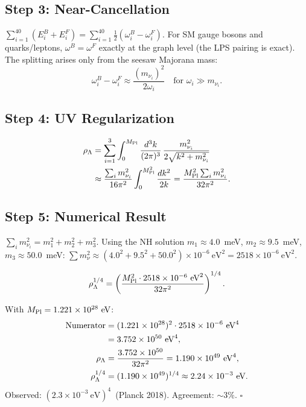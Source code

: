 \documentclass[12pt]{article}
\begin{document}
\subsection{Step 3: Near-Cancellation}

$\sum_{i=1}^{40}(E_i^B+E_i^F) = \sum_{i=1}^{40}\frac{1}{2}(\omega_i^B-\omega_i^F)$.
For SM gauge bosons and quarks/leptons, $\omega^B=\omega^F$ exactly at the
graph level (the LPS pairing is exact). The splitting arises only from
the seesaw Majorana mass:
\begin{equation}
  \omega_i^B - \omega_i^F \approx \frac{(m_{\nu_i})^2}{2\omega_i}
  \quad\text{for }\omega_i\gg m_{\nu_i}.
\end{equation}

\subsection{Step 4: UV Regularization}

\begin{align}
  \rho_\Lambda &= \sum_{i=1}^3 \int_0^{M_{\rm Pl}} \frac{d^3k}{(2\pi)^3}\,
  \frac{m_{\nu_i}^2}{2\sqrt{k^2+m_{\nu_i}^2}} \notag\\
  &\approx \frac{\sum_i m_{\nu_i}^2}{16\pi^2}\int_0^{M_{\rm Pl}^2}\frac{dk^2}{2k}
  = \frac{M_{\rm Pl}^2\sum_i m_{\nu_i}^2}{32\pi^2}.
\end{align}

\subsection{Step 5: Numerical Result}

$\sum_i m_{\nu_i}^2 = m_1^2+m_2^2+m_3^2$.
Using the NH solution $m_1\approx4.0$~meV, $m_2\approx9.5$~meV,
$m_3\approx50.0$~meV:
$\sum m_\nu^2 \approx (4.0^2+9.5^2+50.0^2)\times10^{-6}~\text{eV}^2
= 2518\times10^{-6}~\text{eV}^2$.

\begin{equation}
  \rho_\Lambda^{1/4} = \left(\frac{M_{\rm Pl}^2\cdot2518\times10^{-6}~\text{eV}^2}
    {32\pi^2}\right)^{1/4}.
\end{equation}

With $M_{\rm Pl}=1.221\times10^{28}~\text{eV}$:
\begin{align}
  \text{Numerator} &= (1.221\times10^{28})^2\cdot2518\times10^{-6}~\text{eV}^4 \notag\\
  &= 3.752\times10^{50}~\text{eV}^4, \notag\\
  \rho_\Lambda &= \frac{3.752\times10^{50}}{32\pi^2} = 1.190\times10^{49}~\text{eV}^4,\\
  \rho_\Lambda^{1/4} &= (1.190\times10^{49})^{1/4} \approx 2.24\times10^{-3}~\text{eV}.
\end{align}
Observed: $(2.3\times10^{-3}~\text{eV})^4$~(Planck 2018). Agreement: $\sim3\%$. $\square$
\end{document}
